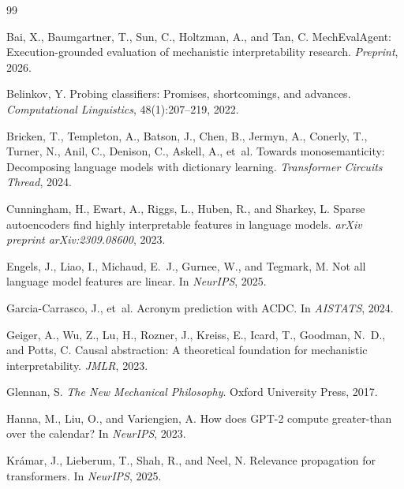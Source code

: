 \documentclass[10pt]{article}
\begin{document}


\begin{thebibliography}{99}

Bai, X., Baumgartner, T., Sun, C., Holtzman, A., and Tan, C.
\newblock MechEvalAgent: Execution-grounded evaluation of mechanistic interpretability research.
\newblock \emph{Preprint}, 2026.

Belinkov, Y.
\newblock Probing classifiers: Promises, shortcomings, and advances.
\newblock \emph{Computational Linguistics}, 48(1):207--219, 2022.

Bricken, T., Templeton, A., Batson, J., Chen, B., Jermyn, A., Conerly, T., Turner, N., Anil, C., Denison, C., Askell, A., et~al.
\newblock Towards monosemanticity: Decomposing language models with dictionary learning.
\newblock \emph{Transformer Circuits Thread}, 2024.

Cunningham, H., Ewart, A., Riggs, L., Huben, R., and Sharkey, L.
\newblock Sparse autoencoders find highly interpretable features in language models.
\newblock \emph{arXiv preprint arXiv:2309.08600}, 2023.

Engels, J., Liao, I., Michaud, E.~J., Gurnee, W., and Tegmark, M.
\newblock Not all language model features are linear.
\newblock In \emph{NeurIPS}, 2025.

Garcia-Carrasco, J., et~al.
\newblock Acronym prediction with ACDC.
\newblock In \emph{AISTATS}, 2024.

Geiger, A., Wu, Z., Lu, H., Rozner, J., Kreiss, E., Icard, T., Goodman, N.~D., and Potts, C.
\newblock Causal abstraction: A theoretical foundation for mechanistic interpretability.
\newblock \emph{JMLR}, 2023.

Glennan, S.
\newblock \emph{The New Mechanical Philosophy}.
\newblock Oxford University Press, 2017.

Hanna, M., Liu, O., and Variengien, A.
\newblock How does {GPT}-2 compute greater-than over the calendar?
\newblock In \emph{NeurIPS}, 2023.

Kr{\'a}mar, J., Lieberum, T., Shah, R., and Neel, N.
\newblock Relevance propagation for transformers.
\newblock In \emph{NeurIPS}, 2025.


\end{thebibliography}
\end{document}
